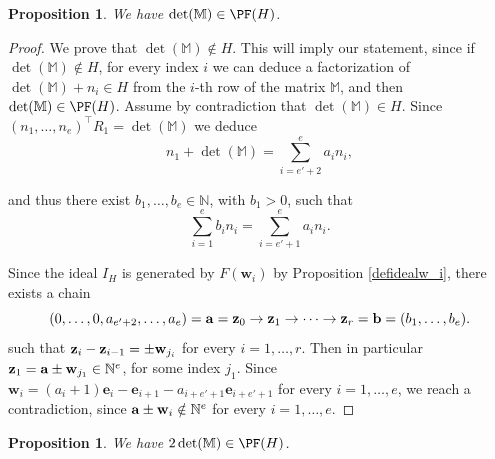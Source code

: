 \documentclass[11pt,twoside]{amsart}
\newcommand{\N}{\mathbb N}
\newcommand{\MM}{\mathbb M}
\def\bw{{\mathbf w}}
\def\be{{\mathbf e}}
\def\bbM{{\mathbb M}}
\newtheorem{prop}[Theorem]{Proposition}
\theoremstyle{definition}
\numberwithin{equation}{section}
\begin{document}
\begin{prop}\label{detnot}
 We have   $\det(\MM)\in \PF(H)$.
\end{prop}
\begin{proof}
We prove that $\det(\MM) \notin H$.
This will imply our statement, since if $\det(\bbM) \not \in H$, for every index $i$ we can deduce a factorization of $\det(\bbM)+n_i \in H$ from the $i$-th row of the matrix $\bbM$,
and then $\det(\bbM) \in \PF(H)$.
Assume by contradiction that $\det(\MM) \in H$. 
Since $(n_1, \ldots , n_e)^\intercal R_1 = \det(\bbM)$ we deduce
$$n_1 + \det(\MM) = \sum_{i=e'+2}^e a_in_i,$$

and thus there exist $b_1,\ldots,b_e \in \N$, with $b_1 > 0$, such that 
    $$\sum_{i=1}^e b_i n_i = \sum_{i=e'+1}^e a_in_i.$$
 
Since the ideal $I_H$ is generated by $F(\bw_i)$ by Proposition \ref{defidealw_i}, there exists a chain 
$$(0,\ldots,0,a_{e'+2},\ldots,a_e)={\bf a}={\bf z}_0 \rightarrow {\bf z}_1 \rightarrow \cdots \rightarrow {\bf z}_r = {\bf b}=(b_1,\ldots,b_e).$$ such that ${\bf z}_i-{\bf z}_{i-1}=\pm \bw_{j_i}$ for every $i=1,\ldots,r$. 
Then in particular ${\bf z}_1 = {\bf a} \pm \bw_{j_1} \in \N^e$, for some index $j_1$. 
Since $\bw_i = (a_i+1)\be_i-\be_{i+1}-a_{i+e'+1}\be_{i+e'+1}$ for every $i=1,\ldots,e$, we reach a contradiction, since ${\bf a} \pm \bw_i \notin \N^e$ for every $i=1,\ldots,e$. 
\end{proof}
\begin{prop}\label{2detnot}
We have $2\det(\bbM) \in \PF(H)$.
\end{prop}
\end{document}
